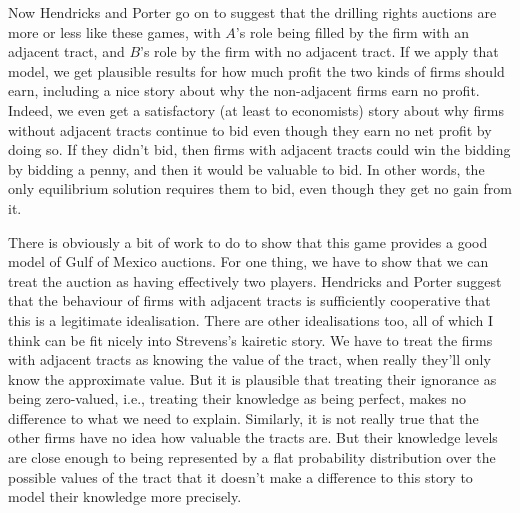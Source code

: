 \documentclass[
  11pt,
  letterpaper,
  DIV=11,
  numbers=noendperiod,
  oneside]{scrartcl}
\begin{document}
Now Hendricks and Porter go on to suggest that the drilling rights
auctions are more or less like these games, with \(A\)'s role being
filled by the firm with an adjacent tract, and \(B\)'s role by the firm
with no adjacent tract.
If we apply that model, we get plausible results for how much profit the
two kinds of firms should earn, including a nice story about why the
non-adjacent firms earn no profit. Indeed, we even get a satisfactory
(at least to economists) story about why firms without adjacent tracts
continue to bid even though they earn no net profit by doing so. If they
didn't bid, then firms with adjacent tracts could win the bidding by
bidding a penny, and then it would be valuable to bid. In other words,
the only equilibrium solution requires them to bid, even though they get
no gain from it.

There is obviously a bit of work to do to show that this game provides a
good model of Gulf of Mexico auctions. For one thing, we have to show
that we can treat the auction as having effectively two players.
Hendricks and Porter suggest that the behaviour of firms with adjacent
tracts is sufficiently cooperative that this is a legitimate
idealisation. There are other idealisations too, all of which I think
can be fit nicely into Strevens's kairetic story. We have to treat the
firms with adjacent tracts as knowing the value of the tract, when
really they'll only know the approximate value. But it is plausible that
treating their ignorance as being zero-valued, i.e., treating their
knowledge as being perfect, makes no difference to what we need to
explain. Similarly, it is not really true that the other firms have no
idea how valuable the tracts are. But their knowledge levels are close
enough to being represented by a flat probability distribution over the
possible values of the tract that it doesn't make a difference to this
story to model their knowledge more precisely.
\end{document}
